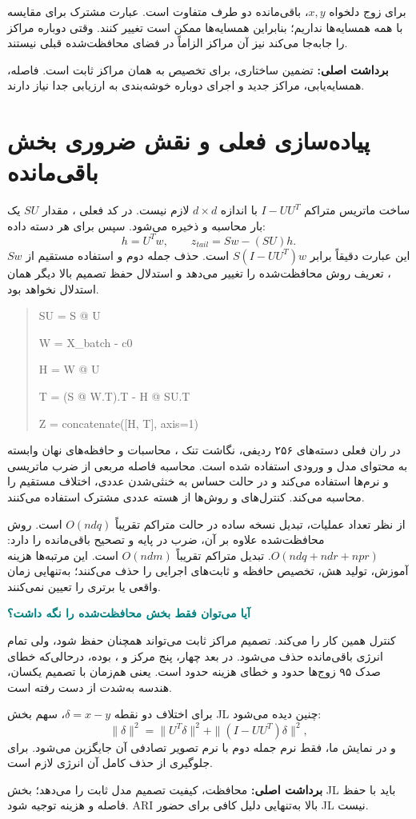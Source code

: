 \documentclass[11pt,a4paper]{article}
\newcommand{\lesson}[1]{\clearpage\section{#1}}
\newcommand{\key}[1]{\par\vspace{4pt}\noindent\colorbox{pale}{\parbox{\dimexpr\textwidth-2\fboxsep\relax}{\textbf{برداشت اصلی:} #1}}\par\vspace{3pt}}
\newcommand{\sub}[1]{\par\vspace{3pt}\textbf{\textcolor{teal}{#1}}\par}
\begin{document}
برای زوج دلخواه \(x,y\)، باقی‌مانده دو طرف متفاوت است. عبارت مشترک برای مقایسه با همه همسایه‌ها نداریم؛ بنابراین همسایه‌ها ممکن است تغییر کنند. وقتی  دوباره مراکز را جابه‌جا می‌کند نیز آن مراکز الزاماً در فضای محافظت‌شده قبلی نیستند.
\key{تضمین ساختاری، برای تخصیص به همان مراکز ثابت است. فاصله، همسایه‌یابی، مراکز جدید و اجرای دوباره خوشه‌بندی به ارزیابی جدا نیاز دارند.}

\lesson{پیاده‌سازی فعلی و نقش ضروری بخش باقی‌مانده}
ساخت ماتریس متراکم \(I-UU^T\) با اندازه \(d\times d\) لازم نیست. در کد فعلی ، مقدار \(SU\) یک بار محاسبه و ذخیره می‌شود. سپس برای هر دسته داده:
\[
 h=U^Tw,\qquad z_{tail}=Sw-(SU)h.
\]
این عبارت دقیقاً برابر \(S(I-UU^T)w\) است. حذف جمله دوم و استفاده مستقیم از \(Sw\)، تعریف روش محافظت‌شده را تغییر می‌دهد و استدلال حفظ تصمیم بالا دیگر همان استدلال نخواهد بود.
\begin{latin}
\begin{quote}\ttfamily\small
SU = S @ U\par
W = X\_batch - c0\par
H = W @ U\par
T = (S @ W.T).T - H @ SU.T\par
Z = concatenate([H, T], axis=1)
\end{quote}
\end{latin}
در ران فعلی دسته‌های ۲۵۶ ردیفی، نگاشت تنک ، محاسبات  و حافظه‌های نهان وابسته به محتوای مدل و ورودی استفاده شده است. محاسبه فاصله مربعی از ضرب ماتریسی و نرم‌ها استفاده می‌کند و در حالت حساس به خنثی‌شدن عددی، اختلاف مستقیم را محاسبه می‌کند. کنترل‌های  و روش‌ها از هسته عددی مشترک استفاده می‌کنند.

از نظر تعداد عملیات، تبدیل نسخه ساده در حالت متراکم تقریباً \(O(ndq)\) است. روش محافظت‌شده علاوه بر آن، ضرب در پایه و تصحیح باقی‌مانده را دارد: \(O(ndq+ndr+npr)\). تبدیل متراکم  تقریباً \(O(ndm)\) است. این مرتبه‌ها هزینه آموزش، تولید هش، تخصیص حافظه و ثابت‌های اجرایی را حذف می‌کنند؛ به‌تنهایی زمان واقعی یا برتری را تعیین نمی‌کنند.

\sub{آیا می‌توان فقط بخش محافظت‌شده را نگه داشت؟}
کنترل  همین کار را می‌کند. تصمیم مراکز ثابت می‌تواند همچنان حفظ شود، ولی تمام انرژی باقی‌مانده حذف می‌شود. در بعد چهار، پنج مرکز و ،  بوده، درحالی‌که خطای صدک ۹۵ زوج‌ها حدود  و خطای هزینه حدود  است. یعنی هم‌زمان با تصمیم یکسان، هندسه به‌شدت از دست رفته است.

برای اختلاف دو نقطه \(\delta=x-y\)، سهم بخش JL چنین دیده می‌شود:
\[
 \|\delta\|^2=\|U^T\delta\|^2+\|(I-UU^T)\delta\|^2,
\]
و در نمایش ما، فقط نرم جمله دوم با نرم تصویر تصادفی آن جایگزین می‌شود.  برای جلوگیری از حذف کامل آن انرژی لازم است.
\key{محافظت، کیفیت تصمیم مدل ثابت را می‌دهد؛ بخش JL باید با حفظ فاصله و هزینه توجیه شود. ARI بالا به‌تنهایی دلیل کافی برای حضور JL نیست.}
\end{document}
